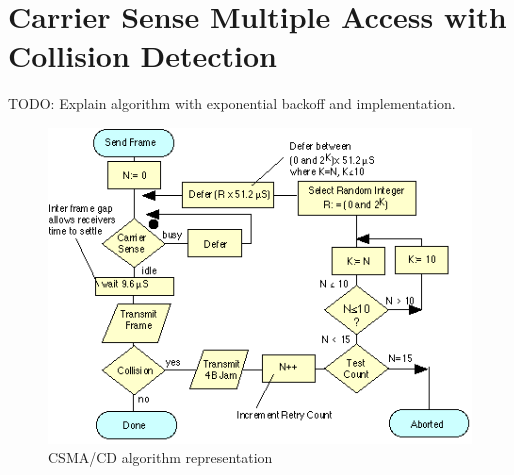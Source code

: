 \section{Carrier Sense Multiple Access with Collision Detection}

TODO: Explain algorithm with exponential backoff and implementation.

\begin{figure}[h!]
  \centering
    \includegraphics[width=\textwidth]{figures/csmacd.png}
  \caption{CSMA/CD algorithm representation}
\end{figure}


